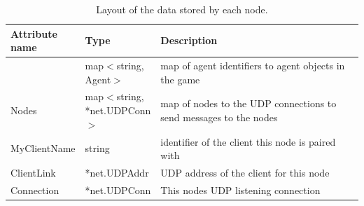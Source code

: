 \begin{table}[htb]
\centering
	\begin{tabular}{p{0.2\linewidth} | p{0.2\linewidth} | p{0.6\linewidth}}
	\textbf{Attribute name} & \textbf{Type} & \textbf{Description} \\ \hline
	\gamestate & map$<$string, Agent$>$ & map of agent identifiers to agent objects in the game \\ \hline
	Nodes & map$<$string, *net.UDPConn$>$ & map of nodes to the UDP connections to send messages to the nodes \\ \hline
	MyClientName & string  & identifier of the client this node is paired with\\  \hline
	ClientLink & *net.UDPAddr & UDP address of the client for this node\\ \hline
	Connection & *net.UDPConn & This nodes UDP listening connection \\ \hline	
	\end{tabular}
	\caption{\label{table:gamestate-discription} Layout of the data stored by each node.}
\end{table}
